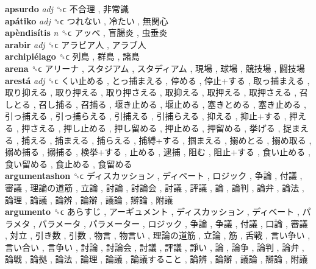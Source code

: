 \textbf{apsurdo} \emph{adj}  ␝ϲ   不合理 ,  非常識   \\
\textbf{apátiko} \emph{adj}  ␝ϲ   つれない ,  冷たい ,  無関心   \\
\textbf{apèndisítis} \emph{n}  ␝ϲ   アッペ ,  盲腸炎 ,  虫垂炎   \\
\textbf{arabir} \emph{adj}  ␝ϲ   アラビア人 ,  アラブ人   \\
\textbf{archipiélago} ␝ϲ   列島 ,  群島 ,  諸島   \\
\textbf{arena} ␝ϲ   アリーナ ,  スタジアム ,  スタディアム ,  現場 ,  球場 ,  競技場 ,  闘技場   \\
\textbf{arestá} \emph{adj}  ␝ϲ   くい止める ,  とっ捕まえる ,  停める ,  停止+する ,  取っ捕まえる ,  取り抑える ,  取り押える ,  取り押さえる ,  取抑える ,  取押える ,  取押さえる ,  召しとる ,  召し捕る ,  召捕る ,  堰き止める ,  堰止める ,  塞きとめる ,  塞き止める ,  引っ捕える ,  引っ捕らえる ,  引捕える ,  引捕らえる ,  抑える ,  抑止+する ,  押える ,  押さえる ,  押し止める ,  押し留める ,  押止める ,  押留める ,  挙げる ,  捉まえる ,  捕える ,  捕まえる ,  捕らえる ,  捕縛+する ,  掴まえる ,  搦めとる ,  搦め取る ,  搦め捕る ,  搦捕る ,  検挙+する ,  止める ,  逮捕 ,  阻む ,  阻止+する ,  食い止める ,  食い留める ,  食止める ,  食留める   \\
\textbf{argumentashon} ␝ϲ   ディスカッション ,  ディベート ,  ロジック ,  争論 ,  付議 ,  審議 ,  理論の道筋 ,  立論 ,  討論 ,  討論会 ,  討議 ,  評議 ,  論 ,  論判 ,  論弁 ,  論法 ,  論理 ,  論議 ,  論辨 ,  論辯 ,  議論 ,  辯論 ,  附議   \\
\textbf{argumento} ␝ϲ   あらすじ ,  アーギュメント ,  ディスカッション ,  ディベート ,  パラメタ ,  パラメータ ,  パラメーター ,  ロジック ,  争論 ,  争議 ,  付議 ,  口論 ,  審議 ,  対立 ,  引き数 ,  引数 ,  物言 ,  物言い ,  理論の道筋 ,  立論 ,  筋 ,  舌戦 ,  言い争い ,  言い合い ,  言争い ,  討論 ,  討論会 ,  討議 ,  評議 ,  諍い ,  論 ,  論争 ,  論判 ,  論弁 ,  論戦 ,  論拠 ,  論法 ,  論理 ,  論議 ,  論議すること ,  論辨 ,  論辯 ,  議論 ,  辯論 ,  附議   \\
